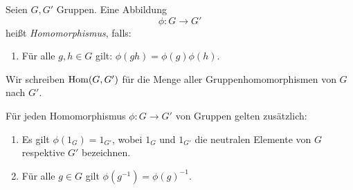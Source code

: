 \documentclass{book}
\begin{document}
\begin{defi}
    \label{defi:ghom}
    Seien $G,G'$ Gruppen. Eine Abbildung  
    \[
        \phi: G \to G'
    \]
    heißt {\em Homomorphismus}, falls:
    \begin{enumerate}[leftmargin=1.2cm, label=(H\arabic*), series=hom]
        \item\label{it:H1} Für alle $g,h \in G$ gilt: $\phi(gh) = \phi(g)\phi(h)$.
    \end{enumerate}
    Wir schreiben $\operatorname{Hom}(G,G')$ für die Menge aller Gruppenhomomorphismen von
    $G$ nach $G'$. 
\end{defi}

\begin{prob}
    \label{prob:hom}
    Für jeden Homomorphismus $\phi: G \to G'$ von Gruppen gelten zusätzlich:
    \begin{enumerate}[leftmargin=1.2cm,label=(H\arabic*), resume=hom]
        \item\label{it:H2} Es gilt $\phi(1_G) = 1_{G'}$, wobei $1_G$ und $1_{G'}$ die
            neutralen Elemente von $G$ respektive $G'$ bezeichnen.
        \item\label{it:H3} Für alle $g \in G$ gilt $\phi(g^{-1})= \phi(g)^{-1}$. 
    \end{enumerate}
\end{prob}
\end{document}
